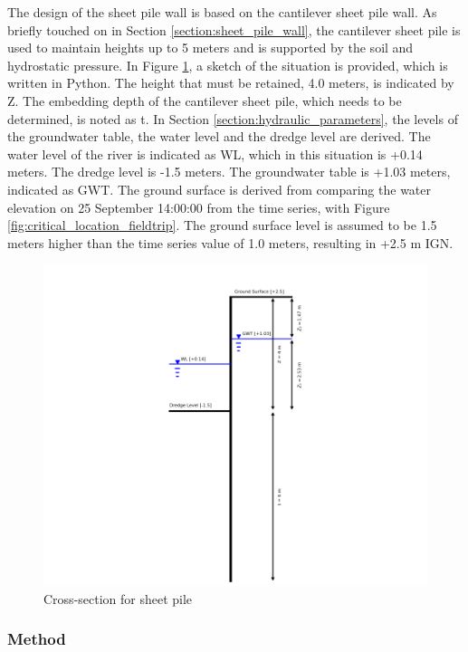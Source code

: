 The design of the sheet pile wall is based on the cantilever sheet pile wall. As briefly touched on in Section \ref{section:sheet_pile_wall}, the cantilever sheet pile is used to maintain heights up to 5 meters and is supported by the soil and hydrostatic pressure. In Figure \ref{fig:problem_description_sheetpiles}, a sketch of the situation is provided, which is written in Python. The height that must be retained, 4.0 meters, is indicated by Z. The embedding depth of the cantilever sheet pile, which needs to be determined, is noted as t. In  Section \ref{section:hydraulic_parameters}, the levels of the groundwater table, the water level and the dredge level are derived. The water level of the river is indicated as WL, which in this situation is +0.14 meters. The dredge level is -1.5 meters. The groundwater table is +1.03 meters, indicated as GWT. The ground surface is derived from comparing the water elevation on 25 September 14:00:00 from the time series, with Figure \ref{fig:critical_location_fieldtrip}. The ground surface level is assumed to be 1.5 meters higher than the time series value of 1.0 meters, resulting in +2.5 m IGN.

\begin{figure}[H]
    \centering
    \includegraphics[width=0.90\linewidth]{figures/ch8/cross_section.png}
    \caption{Cross-section for sheet pile}
    \label{fig:problem_description_sheetpiles}
\end{figure}

\subsubsection{Method}

